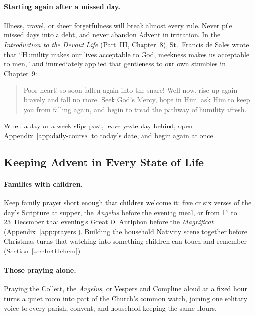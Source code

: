 \paragraph{Starting again after a missed day.}
Illness, travel, or sheer forgetfulness will break almost every rule. Never pile missed days into a debt, and never abandon Advent in irritation. In the \textit{Introduction to the Devout Life} (Part~III, Chapter~8), St.~Francis de Sales wrote that ``Humility makes our lives acceptable to God, meekness makes us acceptable to men,'' and immediately applied that gentleness to our own stumbles in Chapter~9:

\begin{quote}
Poor heart! so soon fallen again into the snare! Well now, rise up again bravely and fall no more. Seek God's Mercy, hope in Him, ask Him to keep you from falling again, and begin to tread the pathway of humility afresh.
\end{quote}

When a day or a week slips past, leave yesterday behind, open Appendix~\ref{app:daily-course} to today's date, and begin again at once.

\subsection{Keeping Advent in Every State of Life}

\paragraph{Families with children.}
Keep family prayer short enough that children welcome it: five or six verses of the day's Scripture at supper, the \textit{Angelus} before the evening meal, or from 17 to 23~December that evening's Great O~Antiphon before the \textit{Magnificat} (Appendix~\ref{app:prayers}). Building the household Nativity scene together before Christmas turns that watching into something children can touch and remember (Section~\ref{sec:bethlehem}).

\paragraph{Those praying alone.}
Praying the Collect, the \textit{Angelus}, or Vespers and Compline aloud at a fixed hour turns a quiet room into part of the Church's common watch, joining one solitary voice to every parish, convent, and household keeping the same Hours.

